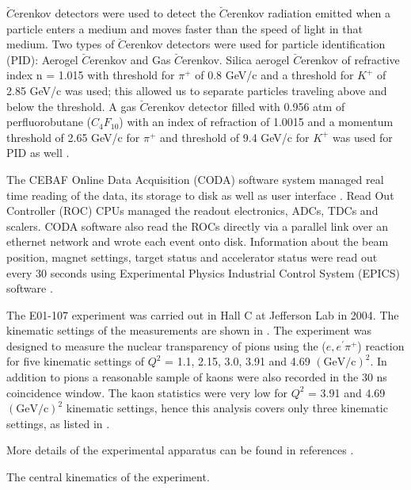 $\breve{C}$erenkov detectors were used to detect the $\breve{C}$erenkov radiation emitted when a particle enters a medium and moves faster than the speed of light in that medium. Two types of $\breve{C}$erenkov detectors were used for particle identification (PID): Aerogel $\breve{C}$erenkov and Gas $\breve{C}$erenkov. Silica aerogel $\breve{C}$erenkov of refractive index n = 1.015 with threshold for $\pi^+$ of 0.8 GeV/c and a threshold for $K^+$ of 2.85 GeV/c was used; this allowed us to separate particles traveling above and below the threshold. A gas $\breve{C}$erenkov detector filled with 0.956 atm of perfluorobutane ($C_4F_{10}$) with an index of refraction of 1.0015 and a momentum threshold of 2.65 GeV/c for $\pi^+$ and threshold of 9.4 GeV/c for $K^+$ was used for PID as well \cite{BC06}.

%
%
\label{Data Acquisition}
The CEBAF Online Data Acquisition (CODA) software system managed real time reading of the data, its storage to disk as well as user interface \cite{Abb95}. Read Out Controller (ROC) CPUs managed the readout electronics, ADCs, TDCs and scalers. CODA software also read the ROCs directly via a parallel link over an ethernet network and wrote each event onto disk. Information about the beam position, magnet settings, target status and accelerator status were read out every 30 seconds using Experimental Physics Industrial Control System (EPICS) software \cite{RM99}.

%
%
\label{Kinematic Settings}%
The E01-107 experiment was carried out in Hall C at Jefferson Lab \cite{CW01} in 2004. The kinematic settings of the measurements are shown in . The experiment was designed to measure the nuclear transparency of pions using the ($e,e^\prime \pi^+$) reaction for five kinematic settings of $Q^2$ = 1.1, 2.15, 3.0, 3.91 and 4.69 $\mathrm{(GeV/c)^2}$. In addition to pions a reasonable sample of kaons were also recorded in the 30 ns coincidence window. The kaon statistics were very low for $Q^2$ = 3.91 and 4.69 $\mathrm{(GeV/c)^2}$ kinematic settings, hence this analysis covers only three kinematic settings, as listed in .

More details of the experimental apparatus can be found in references \cite{BC06, RM99, hinton01}.

\begin{table}
  \caption[The central kinematics of the experiment.]{\label{tab:kine}The central kinematics of the experiment.}

\end{table}
